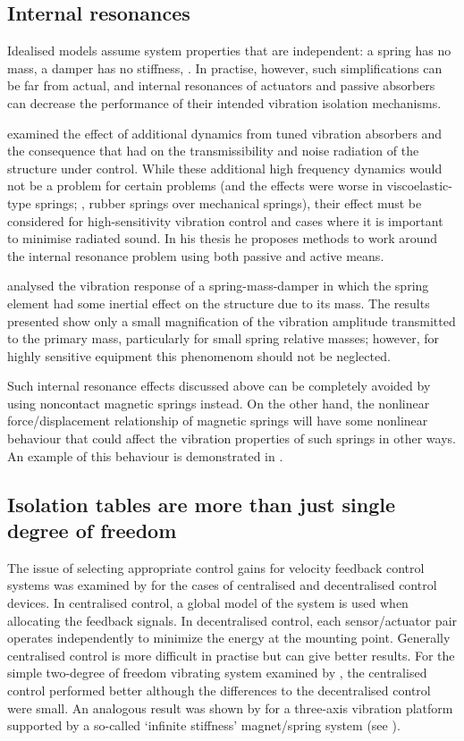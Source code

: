   

\subsection{Internal resonances}

Idealised models assume system properties that are independent: a
spring has no mass, a damper has no stiffness, \etc. In practise,
however, such simplifications can be far from actual, and internal
resonances of actuators and passive absorbers can decrease the
performance of their intended vibration isolation
mechanisms. 

\textcite{du2003thesis} examined the effect of additional dynamics
from tuned vibration absorbers and the consequence that had on the
transmissibility and noise radiation of the structure under
control. While these additional high frequency dynamics would not be a
problem for certain problems (and the effects were worse in
viscoelastic-type springs; \ie, rubber springs over mechanical springs),
their effect must be considered for high-sensitivity vibration control
and cases where it is important to minimise radiated sound. In his
thesis he proposes methods to work around the internal resonance
problem using both passive and active means.

\textcite{wu2006} analysed the vibration response of a spring-mass-damper in
which the spring element had some inertial effect on the structure due to its
mass. The results presented show only a small magnification of the vibration
amplitude transmitted to the primary mass, particularly for small spring
relative masses; however, for highly sensitive equipment this phenomenom
should not be neglected.

Such internal resonance effects discussed above can be completely avoided by
using noncontact magnetic springs instead. On the other hand, the nonlinear
force/displacement relationship of magnetic springs will have some nonlinear
behaviour that could affect the vibration properties of such springs in other
ways. An example of this behaviour is demonstrated in
.

\subsection{Isolation tables are more than just single degree of freedom}

The issue of selecting appropriate control gains for velocity feedback control
systems was examined by \textcite{engels2008} for the cases of centralised and
decentralised control devices. In centralised control, a global model of the
system is used when allocating the feedback signals. In decentralised control,
each sensor/actuator pair operates independently to minimize the energy at the
mounting point. Generally centralised control is more difficult in practise
but can give better results. For the simple two-degree of freedom vibrating
system examined by \textcite{engels2008}, the centralised control performed
better although the differences to the decentralised control were small. An
analogous result was shown by \textcite{hoque2006} for a three-axis vibration
platform supported by a so-called `infinite stiffness' magnet/spring system (see
).

